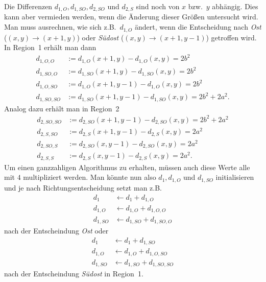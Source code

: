 \documentclass[12pt]{scrartcl}
\begin{document}
Die Differenzen $d_{1,O}, d_{1,SO}, d_{2,SO}$ und $d_{2,S}$ sind noch von $x$ bzw.\ $y$ abhängig.
Dies kann aber vermieden werden, wenn die Änderung dieser Größen untersucht wird.
Man muss ausrechnen, wie sich z.B.\ $d_{1,O}$ ändert, wenn die Entscheidung nach {\em Ost} ($(x,y)\rightarrow(x+1,y)$) oder {\em Südost} ($(x,y)\rightarrow(x+1,y-1)$) getroffen wird.
In Region~1 erhält man dann
\begin{align*}
  d_{1,O,O}   & := d_{1,O}(x+1,y)    - d_{1,O}(x,y)  = 2 b^2\\
  d_{1,SO,O}  & := d_{1,SO}(x+1,y)   - d_{1,SO}(x,y) = 2 b^2\\
  d_{1,O,SO}  & := d_{1,O}(x+1,y-1)  - d_{1,O}(x,y)  = 2 b^2\\
  d_{1,SO,SO} & := d_{1,SO}(x+1,y-1) - d_{1,SO}(x,y) = 2 b^2 + 2 a^2.
\end{align*}
Analog dazu erhält man in Region~2
\begin{align*}
  d_{2,SO,SO} & := d_{2,SO}(x+1,y-1) - d_{2,SO}(x,y) = 2 b^2 + 2 a^2\\
  d_{2,S,SO}  & := d_{2,S}(x+1,y-1)  - d_{2,S}(x,y)  = 2 a^2\\
  d_{2,SO,S}  & := d_{2,SO}(x,y-1)   - d_{2,SO}(x,y) = 2 a^2\\
  d_{2,S,S}   & := d_{2,S}(x,y-1)    - d_{2,S}(x,y)  = 2 a^2.
\end{align*}
Um einen ganzzahligen Algorithmus zu erhalten, müssen auch diese Werte alle mit $4$ multipliziert werden.
Man könnte nun also $d_1, d_{1,O}$ und $d_{1,SO}$ initialisieren und je nach Richtungsentscheidung setzt man z.B.
\begin{align*}
  d_1      & \leftarrow d_1 + d_{1,O}\\
  d_{1,O}  & \leftarrow d_{1,O} + d_{1,O,O}\\
  d_{1,SO} & \leftarrow d_{1,SO} + d_{1,SO,O}
\end{align*}
nach der Entscheindung {\em Ost} oder
\begin{align*}
  d_1      & \leftarrow d_1 + d_{1,SO}\\
  d_{1,O}  & \leftarrow d_{1,O} + d_{1,O,SO}\\
  d_{1,SO} & \leftarrow d_{1,SO} + d_{1,SO,SO}
\end{align*}
nach der Entscheindung {\em Südost} in Region~1.
\end{document}
